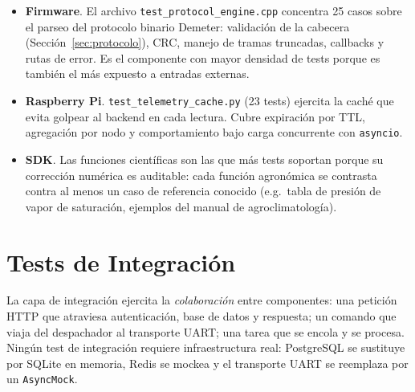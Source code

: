 \begin{itemize}[leftmargin=*, label=--]
    \item \textbf{Firmware}. El archivo \texttt{test\_protocol\_engine.cpp} concentra
          25 casos sobre el parseo del protocolo binario Demeter: validación de la
          cabecera (Sección~\ref{sec:protocolo}), CRC, manejo de tramas truncadas,
          callbacks y rutas de error. Es el componente con mayor densidad de tests
          porque es también el más expuesto a entradas externas.
    \item \textbf{Raspberry Pi}. \texttt{test\_telemetry\_cache.py} (23 tests) ejercita
          la caché que evita golpear al backend en cada lectura. Cubre expiración por
          TTL, agregación por nodo y comportamiento bajo carga concurrente con
          \texttt{asyncio}.
    \item \textbf{SDK}. Las funciones científicas son las que más tests soportan
          porque su corrección numérica es auditable: cada función agronómica se
          contrasta contra al menos un caso de referencia conocido (e.g.\ tabla de
          presión de vapor de saturación, ejemplos del manual de agroclimatología).
\end{itemize}

\section{Tests de Integración}
\label{sec:testing_integration}

La capa de integración ejercita la \textit{colaboración} entre componentes: una
petición HTTP que atraviesa autenticación, base de datos y respuesta; un comando que
viaja del despachador al transporte UART; una tarea que se encola y se procesa.
Ningún test de integración requiere infraestructura real: PostgreSQL se sustituye por
SQLite en memoria, Redis se mockea y el transporte UART se reemplaza por un
\texttt{AsyncMock}.

